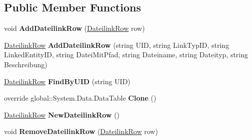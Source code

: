 \subsection*{Public Member Functions}
\begin{DoxyCompactItemize}
\item 
void {\bfseries Add\+Dateilink\+Row} (\hyperlink{class_products_1_1_data_1_1ds_sage_1_1_dateilink_row}{Dateilink\+Row} row)\hypertarget{class_products_1_1_data_1_1ds_sage_1_1_dateilink_data_table_a4f6a3333cebb2342df93fb61185b7a52}{}\label{class_products_1_1_data_1_1ds_sage_1_1_dateilink_data_table_a4f6a3333cebb2342df93fb61185b7a52}

\item 
\hyperlink{class_products_1_1_data_1_1ds_sage_1_1_dateilink_row}{Dateilink\+Row} {\bfseries Add\+Dateilink\+Row} (string U\+ID, string Link\+Typ\+ID, string Linked\+Entity\+ID, string Datei\+Mit\+Pfad, string Dateiname, string Dateityp, string Beschreibung)\hypertarget{class_products_1_1_data_1_1ds_sage_1_1_dateilink_data_table_a050ea08f0ced7f9cb6b3e023ac3fb4a5}{}\label{class_products_1_1_data_1_1ds_sage_1_1_dateilink_data_table_a050ea08f0ced7f9cb6b3e023ac3fb4a5}

\item 
\hyperlink{class_products_1_1_data_1_1ds_sage_1_1_dateilink_row}{Dateilink\+Row} {\bfseries Find\+By\+U\+ID} (string U\+ID)\hypertarget{class_products_1_1_data_1_1ds_sage_1_1_dateilink_data_table_a5ea478f4f46dc56d577dadba87db4626}{}\label{class_products_1_1_data_1_1ds_sage_1_1_dateilink_data_table_a5ea478f4f46dc56d577dadba87db4626}

\item 
override global\+::\+System.\+Data.\+Data\+Table {\bfseries Clone} ()\hypertarget{class_products_1_1_data_1_1ds_sage_1_1_dateilink_data_table_aa2d79b25fb5013b5f3c58608d638332d}{}\label{class_products_1_1_data_1_1ds_sage_1_1_dateilink_data_table_aa2d79b25fb5013b5f3c58608d638332d}

\item 
\hyperlink{class_products_1_1_data_1_1ds_sage_1_1_dateilink_row}{Dateilink\+Row} {\bfseries New\+Dateilink\+Row} ()\hypertarget{class_products_1_1_data_1_1ds_sage_1_1_dateilink_data_table_a75d79223a748e17d882408fc5dd85d84}{}\label{class_products_1_1_data_1_1ds_sage_1_1_dateilink_data_table_a75d79223a748e17d882408fc5dd85d84}

\item 
void {\bfseries Remove\+Dateilink\+Row} (\hyperlink{class_products_1_1_data_1_1ds_sage_1_1_dateilink_row}{Dateilink\+Row} row)\hypertarget{class_products_1_1_data_1_1ds_sage_1_1_dateilink_data_table_a32a56ba23a2326129043bbf595fcea3c}{}\label{class_products_1_1_data_1_1ds_sage_1_1_dateilink_data_table_a32a56ba23a2326129043bbf595fcea3c}

\end{DoxyCompactItemize}

